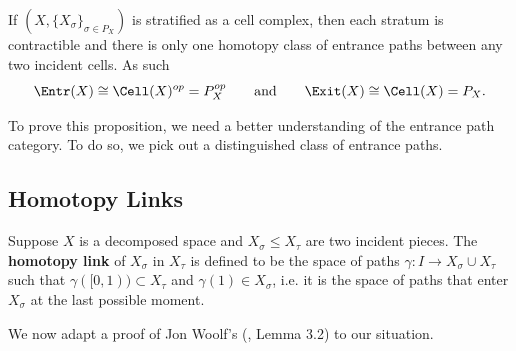 \begin{prop}\label{prop:ep_for_cells}
	If $(X,\{X_{\sigma}\}_{\sigma\in P_X})$ is stratified as a cell complex, then each stratum is contractible and there is only one homotopy class of entrance paths between any two incident cells. As such
	\[
		\Entr(X)\cong\Cell(X)^{op}=P_X^{op} \qquad \mathrm{and} \qquad \Exit(X)\cong\Cell(X)=P_X.
	\]
\end{prop}

To prove this proposition, we need a better understanding of the entrance path category. To do so, we pick out a distinguished class of entrance paths.

\subsection{Homotopy Links}

\begin{defn}
	Suppose $X$ is a decomposed space and $X_{\sigma}\leq X_{\tau}$ are two incident pieces. The \textbf{homotopy link} of $X_{\sigma}$ in $X_{\tau}$ is defined to be the space of paths $\gamma:I\to X_{\sigma}\cup X_{\tau}$ such that $\gamma([0,1))\subset X_{\tau}$ and $\gamma(1)\in X_{\sigma}$, i.e. it is the space of paths that enter $X_{\sigma}$ at the last possible moment.
\end{defn}

We now adapt a proof of Jon Woolf's (\cite{woolf}, Lemma 3.2) to our situation. 

